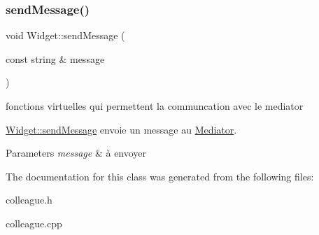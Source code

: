 \subsubsection{\texorpdfstring{send\+Message()}{sendMessage()}}
{\footnotesize\ttfamily void Widget\+::send\+Message (\begin{DoxyParamCaption}\item[{const string \&}]{message }\end{DoxyParamCaption})\hspace{0.3cm}{\ttfamily [virtual]}}



fonctions virtuelles qui permettent la communcation avec le mediator 

\hyperlink{classWidget_a3f249ee26ae63058896027c045477804}{Widget\+::send\+Message} envoie un message au \hyperlink{classMediator}{Mediator}.


\begin{DoxyParams}{Parameters}
{\em message} & à envoyer \\
\hline
\end{DoxyParams}


The documentation for this class was generated from the following files\+:\begin{DoxyCompactItemize}
\item 
colleague.\+h\item 
colleague.\+cpp\end{DoxyCompactItemize}
